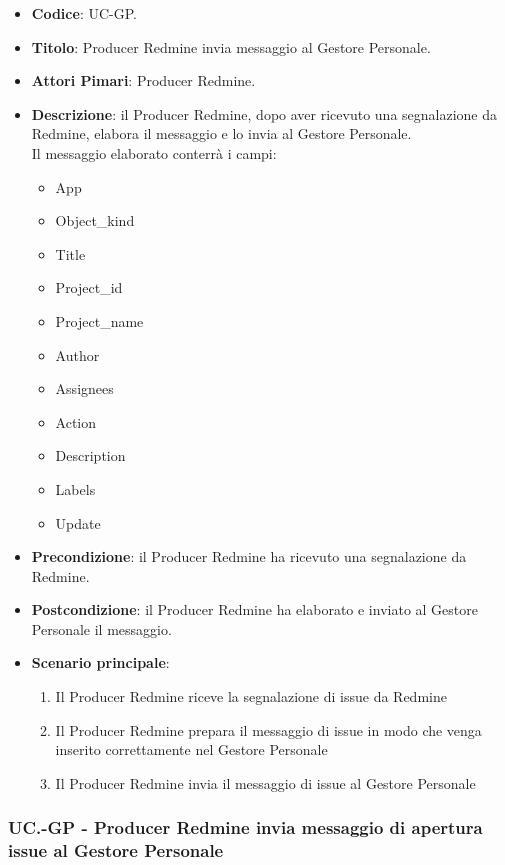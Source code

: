 	\begin{itemize}
		\item \textbf{Codice}: UC\theuccount-GP.
		\item \textbf{Titolo}: Producer Redmine invia messaggio al Gestore Personale.
		\item \textbf{Attori Pimari}: Producer Redmine.
		\item \textbf{Descrizione}: il Producer Redmine, dopo aver ricevuto una
		 segnalazione da Redmine, elabora il messaggio e lo invia al Gestore Personale.\\
		 Il messaggio elaborato conterrà i campi:
		 \begin{itemize}
		 	\item App
		 	\item Object\_kind
		 	\item Title
		 	\item Project\_id
		 	\item Project\_name
		 	\item Author
		 	\item Assignees
		 	\item Action
		 	\item Description
		 	\item Labels
		 	\item Update
		 \end{itemize}
		\item \textbf{Precondizione}: il Producer Redmine ha ricevuto una segnalazione da Redmine.
		\item \textbf{Postcondizione}: il Producer Redmine ha elaborato e inviato al Gestore Personale il messaggio.
		\item \textbf{Scenario principale}: 
		\begin{enumerate}
			\item Il Producer Redmine riceve la segnalazione di issue da Redmine
			\item Il Producer Redmine prepara il messaggio di issue in modo che venga inserito correttamente nel Gestore Personale
			\item Il Producer Redmine invia il messaggio di issue al Gestore Personale
		\end{enumerate}
		
	\end{itemize}
	
	\subsubsection{UC\theuccount.\thesubuccount-GP - Producer Redmine invia messaggio di apertura issue al Gestore Personale}
	
